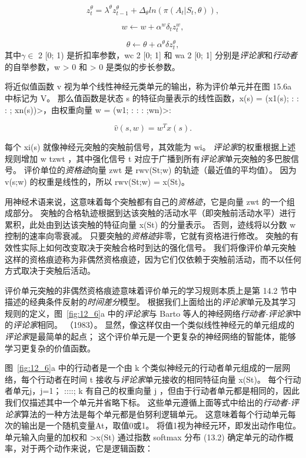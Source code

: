 \begin{equation}
	z_t^{\theta} = \lambda^{\theta} z_{t-1}^{\theta}
		+ \Delta_{\theta} ln(\pi(A_t | S_t, \theta)),
\end{equation}


\begin{equation}
	w \longleftarrow w + \alpha^w \delta_t z_t^w,
\end{equation}

\begin{equation}
	\theta \longleftarrow \theta + \alpha^{\theta} \delta z_t^{\theta},
\end{equation}
其中$\gamma \in $ 2 [0; 1) 是折扣率参数，wc 2 [0; 1] 和 wa 2 [0; 1] 分别是\textit{评论家}和\textit{行动者}的自举参数，w > 0 和 > 0 是类似的步长参数。


将近似值函数 v 视为单个线性神经元类单元的输出，称为评价单元并在图 15.6a 中标记为 V。 那么值函数是状态 s 的特征向量表示的线性函数，x(s) = (x1(s); : : : ; xn(s))>，由权重向量 w = (w1; : : : ;wn)>:

\begin{equation}
	\hat{v}(s, w) = w^T x(s).
\end{equation}


每个 xi(s) 就像神经元突触的突触前信号，其效能为 wi。 
\textit{评论家}的权重根据上述规则增加 w tzwt ，其中强化信号 t 对应于广播到所有\textit{评论家}单元突触的多巴胺信号。
评价单位的\textit{资格迹}向量 zwt 是 rwv(St;w) 的轨迹（最近值的平均值）。
因为 v(s;w) 的权重是线性的，所以 rwv(St;w) = x(St)。


用神经术语来说，这意味着每个突触都有自己的\textit{资格迹}，它是向量 zwt 的一个组成部分。
突触的合格轨迹根据到达该突触的活动水平（即突触前活动水平）进行累积，此处由到达该突触的特征向量 x(St) 的分量表示。
否则，迹线将以分数 w 控制的速率向零衰减。
只要突触的\textit{资格迹}非零，它就有资格进行修改。
突触的有效性实际上如何改变取决于突触合格时到达的强化信号。
我们将像评价单元突触这样的资格痕迹称为非偶然资格痕迹，因为它们仅依赖于突触前活动，而不以任何方式取决于突触后活动。


评价单元突触的非偶然资格痕迹意味着评价单元的学习规则本质上是第 14.2 节中描述的经典条件反射的\textit{时间差分}模型。
根据我们上面给出的\textit{评论家}单元及其学习规则的定义，图~\ref{fig:12_6}a 中的\textit{评论家}与 Barto 等人的神经网络\textit{行动者-评论家}中的\textit{评论家}相同。 （1983）。
显然，像这样仅由一个类似线性神经元的单元组成的\textit{评论家}是最简单的起点；
这个评价单元是一个更复杂的神经网络的智能体，能够学习更复杂的价值函数。


图~\ref{fig:12_6}a 中的行动者是一个由 k 个类似神经元的行动者单元组成的一层网络，每个行动者在时间 t 接收与\textit{评论家}单元接收的相同特征向量 x(St)。
每个行动者单元j，j=1； ::::; k 有自己的权重向量 j ，但由于行动者单元都是相同的，因此我们仅描述其中一个单元并省略下标。
这些单元遵循上面等式中给出的\textit{行动者-评论家}算法的一种方法是每个单元都是伯努利逻辑单元。
这意味着每个行动单元每次的输出是一个随机变量At，取值0或1。
将值1视为神经元环，即发出动作电位。
单元输入向量的加权和 >x(St) 通过指数 softmax 分布 (13.2) 确定单元的动作概率，对于两个动作来说，它是逻辑函数：

